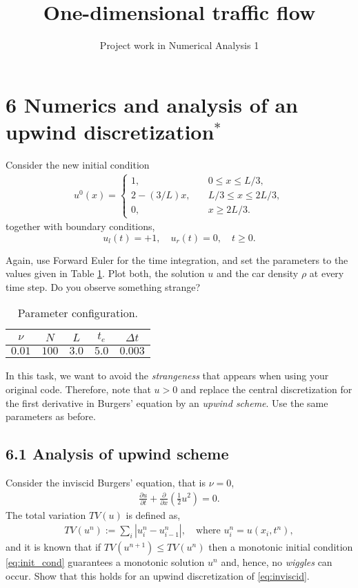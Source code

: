 \documentclass[a4paper,10pt]{article}
\title{\bf One-dimensional traffic flow}
\author{Project work in Numerical Analysis 1}
\begin{document}
\section*{6 Numerics and analysis of an upwind discretization$^\ast$}
Consider the new initial condition 
\begin{align}
\label{eq:init_cond}
 u^0(x) = \begin{cases}
           1, &\quad 0 \leq x \leq L/3, \\
           2-(3/L) x, &\quad L/3 \leq x \leq 2L/3,\\
           0, &\quad x \geq 2L/3.
          \end{cases}
\end{align}
together with boundary conditions,
\[
 u_l(t) = +1, \quad u_r(t) = 0, \quad t \geq 0.
\]

Again, use Forward Euler for the time integration, and set the parameters to the values given in Table \ref{params}. Plot both, the solution $u$ and the car density $\rho$ at every time step. Do you observe something strange?

\begin{table}[ht]
\centering
 \begin{tabular}{|c|c|c|c|c|}
  \hline
  $\nu$ & $N$ & $L$ & $t_e$ & $\Delta t$\\
  \hline
  $0.01$ & $100$ & $3.0$ & $5.0$ & $0.003$\\
  \hline
 \end{tabular}
\caption{Parameter configuration.}\label{params}
\end{table}

In this task, we want to avoid the \textit{strangeness} that appears when using your original code. Therefore, note that $u>0$ and replace the central discretization for the first derivative in Burgers' equation by an \textit{upwind scheme}. Use the same parameters as before.
\subsection*{6.1 Analysis of upwind scheme}
Consider the inviscid Burgers' equation, that is $\nu = 0$,
\begin{align}
\label{eq:inviscid}
 \frac{\partial u}{\partial t} + \frac{\partial}{\partial x} \left( \frac{1}{2}u^2 \right) = 0.
\end{align}
The total variation $TV(u)$ is defined as,
\begin{align*}
TV(u^{n}) := \sum_{i} |u_i^{n} - u_{i-1}^{n}|, \quad \text{where } u_i^n = u(x_i,t^n),
\end{align*}
and it is known that if $TV(u^{n+1}) \leq TV(u^{n})$ then a monotonic initial condition \eqref{eq:init_cond} guarantees a monotonic solution $u^n$ and, hence, no \textit{wiggles} can occur. Show that this holds for an upwind discretization of \eqref{eq:inviscid}.
\end{document}
